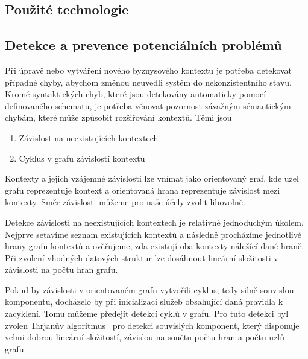 \subsection{Použité technologie}


\subsection{Detekce a prevence potenciálních problémů}

Při úpravě nebo vytváření nového byznysového kontextu je
potřeba detekovat případné chyby, abychom změnou neuvedli
systém do nekonzistentního stavu. Kromě syntaktických chyb,
které jsou detekovány automaticky pomocí definovaného schematu,
je potřeba věnovat pozornost závažným sémantickým chybám,
které může způsobit rozšiřování kontextů.
Těmi jsou
\begin{enumerate}[label=\alph*)]
    \item Závislost na neexistujících kontextech
    \item Cyklus v grafu závislostí kontextů
\end{enumerate}

Kontexty a jejich vzájemné závislosti lze vnímat jako
orientovaný graf, kde uzel grafu reprezentuje kontext
a orientovaná hrana reprezentuje závislost mezi kontexty.
Směr závislosti můžeme pro naše účely zvolit libovolně.

Detekce závislosti na neexistujících kontextech je relativně
jednoduchým úkolem. Nejprve setavíme seznam existujících kontextů
a následně procházíme jednotlivé hrany grafu kontextů a ověřujeme,
zda existují oba kontexty náležící dané hraně.
Při zvolení vhodných datových struktur lze dosáhnout
lineární složitosti v závislosti na počtu hran grafu.

Pokud by závislosti v orientovaném grafu vytvořili cyklus, tedy
silně souvislou komponentu, docházelo by při inicializaci služeb
obsahující daná pravidla k zacyklení. Tomu můžeme předejít
detekcí cyklů v grafu. Pro tuto detekci byl zvolen
Tarjanův algoritmus~\cite{tarjan1971depth} pro detekci souvislých
komponent, který disponuje velmi dobrou lineární složitostí,
závislou na součtu počtu hran a počtu uzlů grafu.

